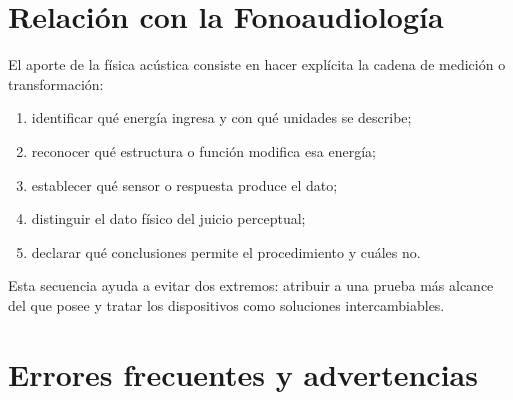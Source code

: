\section{Relación con la Fonoaudiología}
\label{sec:u8-relacion-fonoaudiologia}

El aporte de la física acústica consiste en hacer explícita la cadena de
medición o transformación:

\begin{enumerate}
    \item identificar qué energía ingresa y con qué unidades se describe;
    \item reconocer qué estructura o función modifica esa energía;
    \item establecer qué sensor o respuesta produce el dato;
    \item distinguir el dato físico del juicio perceptual;
    \item declarar qué conclusiones permite el procedimiento y cuáles no.
\end{enumerate}

Esta secuencia ayuda a evitar dos extremos: atribuir a una prueba más alcance
del que posee y tratar los dispositivos como soluciones intercambiables.

\section{Errores frecuentes y advertencias}
\label{sec:u8-errores}

